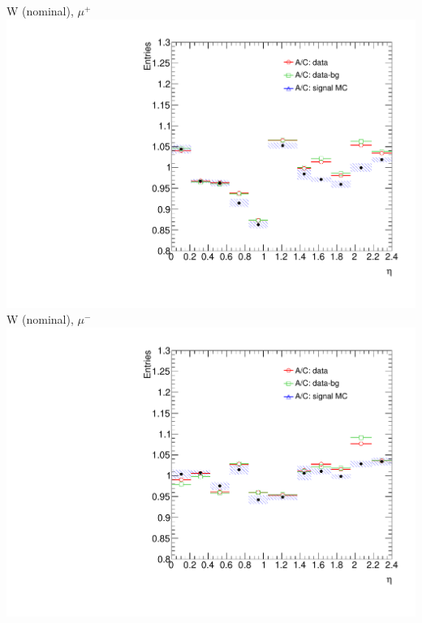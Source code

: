  {
\colb[T]
\centering
\small{ W (nominal), $\mu^{+}$}
\includegraphics[width=1.0\textwidth]{dates/20130306/figures/wz/W_NOM_Q0_stack_d3_eta_lpt_met_y_2__1_z_0__1_POS}
\centering
\small{ W (nominal), $\mu^{-}$}
\includegraphics[width=1.0\textwidth]{dates/20130306/figures/wz/W_NOM_Q0_stack_d3_eta_lpt_met_y_2__1_z_0__1_NEG}
\cole
}

